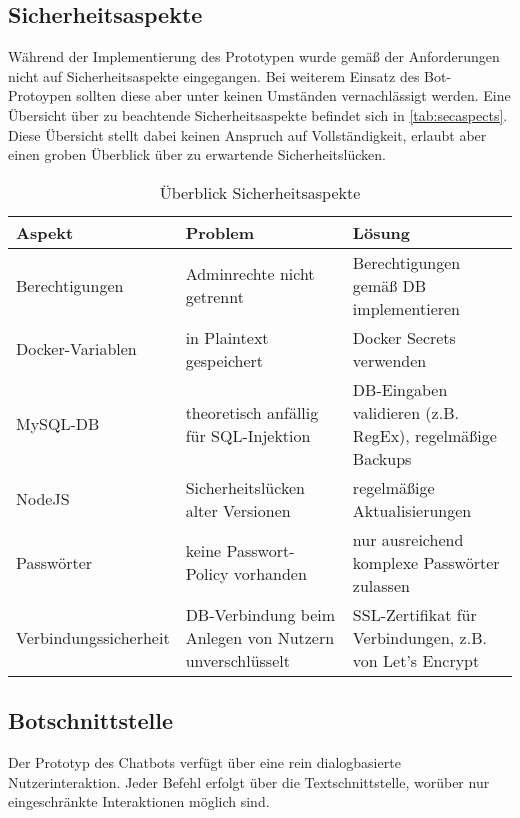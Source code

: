 \subsection{Sicherheitsaspekte}

Während der Implementierung des Prototypen wurde gemäß der Anforderungen nicht auf Sicherheitsaspekte eingegangen. Bei weiterem Einsatz des Bot-Protoypen sollten diese aber unter keinen Umständen vernachlässigt werden. Eine Übersicht über zu beachtende Sicherheitsaspekte befindet sich in \autoref{tab:secaspects}. Diese Übersicht stellt dabei keinen Anspruch auf Vollständigkeit, erlaubt aber einen groben Überblick über zu erwartende Sicherheitslücken.

\begin{table}[h]
    \centering
    \begin{tabularx}{\textwidth}{|X|X|X|}
        \hline
        \textbf{Aspekt} & \textbf{Problem} & \textbf{Lösung} \\
        \hline
        Berechtigungen & Adminrechte nicht getrennt & Berechtigungen gemäß DB implementieren \\
        \hline
        Docker-Variablen & in Plaintext gespeichert & Docker Secrets verwenden \\
        \hline
        MySQL-DB & theoretisch anfällig für SQL-Injektion & DB-Eingaben validieren (z.B. RegEx), regelmäßige Backups \\
        \hline
        NodeJS & Sicherheitslücken alter Versionen & regelmäßige Aktualisierungen \\
        \hline
        Passwörter & keine Passwort-Policy vorhanden & nur ausreichend komplexe Passwörter zulassen \\
        \hline
        Verbindungssicherheit & DB-Verbindung beim Anlegen von Nutzern unverschlüsselt & SSL-Zertifikat für Verbindungen, z.B. von Let's Encrypt \\
        \hline
    \end{tabularx}
    \caption{Überblick Sicherheitsaspekte}
    \label{tab:secaspects}
\end{table}

\subsection{Botschnittstelle}
Der Prototyp des Chatbots verfügt über eine rein dialogbasierte Nutzerinteraktion. Jeder Befehl erfolgt über die Textschnittstelle, worüber nur eingeschränkte Interaktionen möglich sind.

